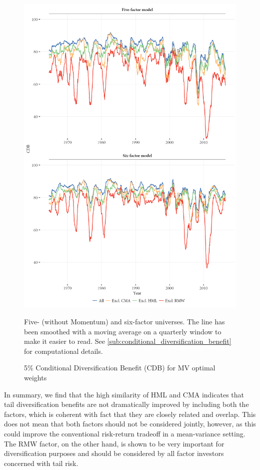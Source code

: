 \begin{figure}[ht!]
  \centering
  \footnotesize
  \includegraphics[width=\textwidth]{graphics/cdb/MV.png}
  \caption{5\% Conditional Diversification Benefit (CDB) for MV optimal weights}

  \begin{longcaption}
    Five- (without Momentum) and six-factor universes. The line has been smoothed with a moving average on a quarterly window to make it easier to read. See \autoref{sub:conditional_diversification_benefit} for computational details.
  \end{longcaption}
  \label{fig:mv_cdb}
\end{figure}



In summary, we find that the high similarity of HML and CMA indicates that tail diversification benefits are not dramatically improved by including both the factors, which is coherent with fact that they are closely related and overlap. This does not mean that both factors should not be considered jointly, however, as this could improve the conventional risk-return tradeoff in a mean-variance setting. The RMW factor, on the other hand, is shown to be very important for diversification purposes and should be considered by all factor investors concerned with tail risk.

